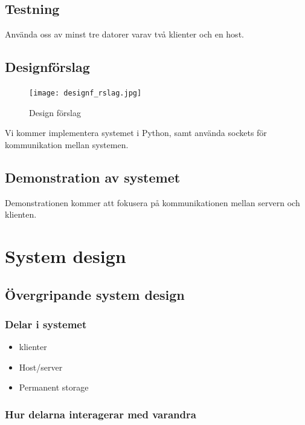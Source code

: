 \documentclass[a4paper]{article}
\begin{document}
\subsection{Testning}
Använda oss av minst tre datorer varav två klienter och en host.

\subsection{Designförslag}
\begin{figure}[H]
\texttt{[image: designf\_rslag.jpg]}
\caption{Design förslag}
\end{figure}

Vi kommer implementera systemet i Python, samt använda sockets för kommunikation mellan
systemen.

\subsection{Demonstration av systemet}
Demonstrationen kommer att fokusera på kommunikationen mellan servern och klienten.

\section{System design}
\subsection{Övergripande system design}
\subsubsection{Delar i systemet}
\begin{itemize}
\item klienter
\item Host/server
\item Permanent storage
\end{itemize}

\subsubsection{Hur delarna interagerar med varandra}
\end{document}
